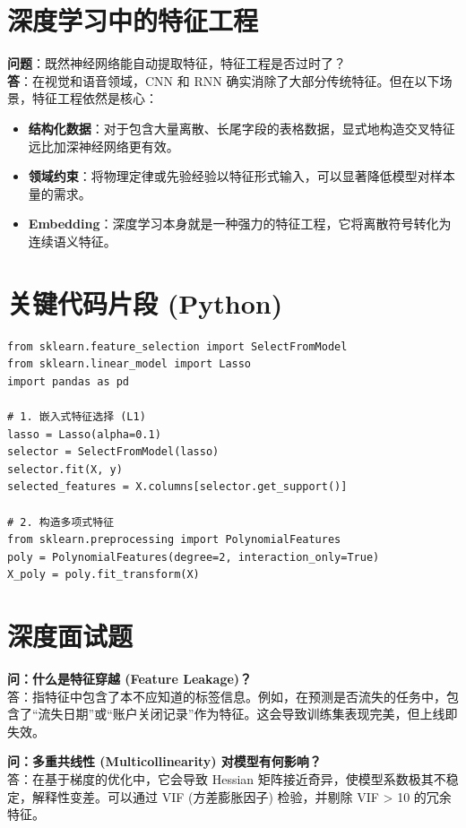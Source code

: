 \documentclass[12pt, a4paper]{article}
\begin{document}
\section{深度学习中的特征工程}
\textbf{问题}：既然神经网络能自动提取特征，特征工程是否过时了？
\\ \textbf{答}：在视觉和语音领域，CNN 和 RNN 确实消除了大部分传统特征。但在以下场景，特征工程依然是核心：
\begin{itemize}
    \item \textbf{结构化数据}：对于包含大量离散、长尾字段的表格数据，显式地构造交叉特征远比加深神经网络更有效。
    \item \textbf{领域约束}：将物理定律或先验经验以特征形式输入，可以显著降低模型对样本量的需求。
    \item \textbf{Embedding}：深度学习本身就是一种强力的特征工程，它将离散符号转化为连续语义特征。
\end{itemize}

\section{关键代码片段 (Python)}
\begin{lstlisting}
from sklearn.feature_selection import SelectFromModel
from sklearn.linear_model import Lasso
import pandas as pd

# 1. 嵌入式特征选择 (L1)
lasso = Lasso(alpha=0.1)
selector = SelectFromModel(lasso)
selector.fit(X, y)
selected_features = X.columns[selector.get_support()]

# 2. 构造多项式特征
from sklearn.preprocessing import PolynomialFeatures
poly = PolynomialFeatures(degree=2, interaction_only=True)
X_poly = poly.fit_transform(X)
\end{lstlisting}

\section{深度面试题}

\textbf{问：什么是特征穿越 (Feature Leakage)？}\\
答：指特征中包含了本不应知道的标签信息。例如，在预测是否流失的任务中，包含了“流失日期”或“账户关闭记录”作为特征。这会导致训练集表现完美，但上线即失效。

\textbf{问：多重共线性 (Multicollinearity) 对模型有何影响？}\\
答：在基于梯度的优化中，它会导致 Hessian 矩阵接近奇异，使模型系数极其不稳定，解释性变差。可以通过 VIF (方差膨胀因子) 检验，并剔除 VIF > 10 的冗余特征。
\end{document}
